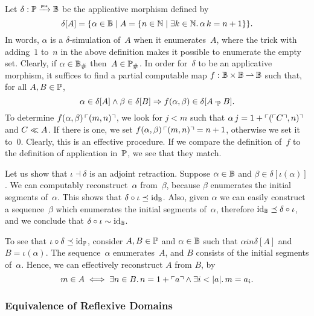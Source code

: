 Let $\delta: \Scott \pcato \Baire$ be the applicative morphism defined by
%
\begin{equation*}
  \delta[A] =
  \set{ \alpha \in \Baire \such
        A = \set{n \in \NN \such \some{k \in \NN} \alpha\,k = n + 1}
  }.
\end{equation*}
%
In words, $\alpha$ is a $\delta$-simulation of~$A$ when it
enumerates~$A$, where the trick with adding~$1$ to~$n$ in the above definition makes it possible to enumerate the empty set. Clearly, if $\alpha \in \comp{\Baire}$
then~$A \in \comp{\Scott}$. In order for~$\delta$ to be an applicative
morphism, it suffices to find a partial computable map $f : \Baire \times \Baire \parto \Baire$ such that,
for all $A, B \in \Scott$,
% 
\begin{equation*}
  \alpha \in \delta[A] \land
  \beta \in \delta[B]
  \lthen
  f (\alpha, \beta) \in \delta[A \cdot_{\Scott} B].
\end{equation*}
% 
To determine $f (\alpha, \beta) \, \code{(m, n)}$, we look for $j < m$ such that $\alpha \, j = 1 + \code{(\code{C}, n)}$ and $C \wayb A$. If there is one, we set $f (\alpha, \beta) \, \code{(m, n)} = n + 1$, otherwise we set it to~$0$.
Clearly, this is an effective procedure. If we compare the definition of~$f$ to the definition of application in~$\Scott$, we see that they match.

Let us show that $\iota \dashv \delta$ is an adjoint retraction.
%
Suppose $\alpha \in \Baire$ and $\beta \in \delta[\iota(\alpha)]$.
%
We can computably reconstruct~$\alpha$ from~$\beta$, because $\beta$ enumerates the initial
segments of~$\alpha$. This shows that $\delta \circ \iota \preceq \id[\Baire]$. Also, given $\alpha$ we can easily
construct a sequence~$\beta$ which enumerates the initial segments of~$\alpha$, therefore
$\id[\Baire] \preceq \delta \circ \iota$, and we conclude that $\delta \circ \iota \sim \id[\Baire]$.

To see that $\iota \circ \delta \preceq \id[\Scott]$, consider $A, B \in \Scott$ and $\alpha \in \Baire$ such that $\alpha in \delta[A]$ and $B = \iota(\alpha)$. The sequence~$\alpha$ enumerates~$A$, and $B$ consists of the initial segments of~$\alpha$. Hence, we can effectively reconstruct $A$ from $B$, by
%
\begin{equation*}
  m \in A
  \iff
  \some{n \in B} n = 1 + \code{a} \land \some{i < |a|} m = a_i.
\end{equation*}


\subsubsection{Equivalence of Reflexive Domains}
\label{sec:equivalence_reflexive_domains}%

